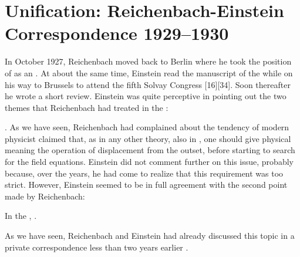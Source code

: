 \documentclass[draft]{article}
\renewcommand{\me}{;~m.e.{}}
\newcommand{\PRZL}{\citetitle{Reichenbach1928}\xspace}
\begin{document}
\section{Unification: Reichenbach-Einstein Correspondence 1929--1930}
\label{unification}
%
In October 1927, Reichenbach moved back to Berlin where he took the position of as an   \citep{Hecht1982}.  At about the same time, Einstein read the manuscript of the \PRZL while on his way to Brussels to attend the fifth Solvay Congress  \citep{Bacciagaluppi2009} [16][34]. Soon thereafter he wrote a short review. Einstein was quite perceptive in pointing out the two themes that Reichenbach had treated in the \Ap: \begin{inparaenum}[(1)] \item {} \citep[20\me]{Einstein1928d}. As we have seen, Reichenbach had complained about the tendency of modern physicist claimed that, as in any other  theory, also in \uft, one should give physical meaning the operation of displacement from the outset, before starting to search for the field equations. Einstein did not comment further on this issue, probably because, over the years, he had come to realize that this requirement was too strict. However, Einstein seemed to be in full agreement with the second point made by Reichenbach: \item In the \Ap,  \citep[20\me]{Einstein1928d}. \end{inparaenum} As we have seen, Reichenbach and Einstein had already discussed this topic in a private correspondence less than two years earlier . 

\end{document}
